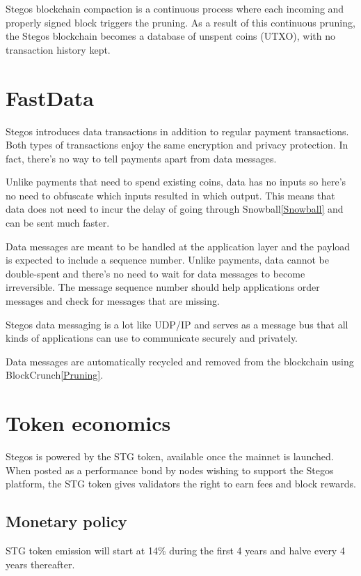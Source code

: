 \documentclass[a4paper, 10pt, conference]{ieeeconf}
\begin{document}
Stegos blockchain compaction is a continuous process where each incoming and properly signed block triggers the pruning. As a result of this continuous pruning, the Stegos blockchain becomes a database of unspent coins (UTXO), with no transaction history kept.

\section{FastData}\label{FastData}
Stegos introduces data transactions in addition to regular payment transactions. Both types of transactions enjoy the same encryption and privacy protection. In fact, there's no way to tell payments apart from data messages. 

Unlike payments that need to spend existing coins, data has no inputs so here's no need to obfuscate which inputs resulted in which output. This means that data does not need to incur the delay of going through Snowball\ref{Snowball} and can be sent much faster.

Data messages are meant to be handled at the application layer and the payload is expected to include a sequence number. Unlike payments, data cannot be double-spent and there's no need to wait for data messages to become irreversible. The message sequence number should help applications order messages and check for messages that are missing. 

Stegos data messaging is a lot like UDP/IP and serves as a message bus that all kinds of applications can use to communicate securely and privately.

Data messages are automatically recycled and removed from the blockchain using BlockCrunch\ref{Pruning}.

\section{Token economics}\label{Tokenomics}
Stegos is powered by the STG token, available once the mainnet is launched. When posted as a performance bond by nodes wishing to support the Stegos platform, the STG token gives validators the right to earn fees and block rewards.

\subsection{Monetary policy}
STG token emission will start at 14\% during the first 4 years and halve every 4 years thereafter.
\end{document}
